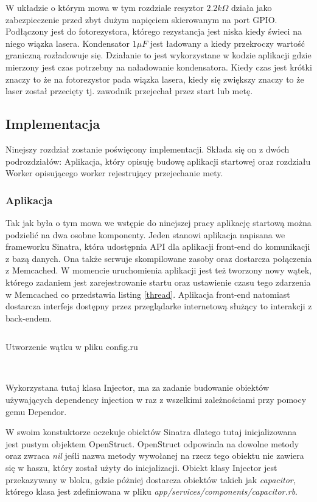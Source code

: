 \documentclass[11pt,a4paper, twoside]{article}
\begin{document}
\begin{minipage}{\textwidth}
\noindent
W układzie o którym mowa w tym rozdziale resyztor $2.2k \Omega$ działa jako zabezpieczenie przed zbyt dużym napięciem skierowanym na port GPIO. Podłączony jest do fotorezystora, którego rezystancja jest niska kiedy świeci na niego wiązka lasera. Kondensator $1\mu F$ jest ładowany a kiedy przekroczy wartość graniczną rozładowuje się. Działanie to jest wykorzystane w kodzie aplikacji gdzie mierzony jest czas potrzebny na naładowanie kondensatora. Kiedy czas jest krótki znaczy to że na fotorezystor pada wiązka lasera, kiedy się zwiększy znaczy to że laser został przecięty tj. zawodnik przejechał przez start lub metę.
\subsection{Implementacja}
Ninejszy rozdział zostanie poświęcony implementacji. Składa się on z dwóch podrozdziałów: Aplikacja, który opisuję budowę aplikacji startowej oraz rozdziału Worker opisującego worker rejestrujący przejechanie mety.
\subsubsection{Aplikacja}
Tak jak była o tym mowa we wstępie do ninejszej pracy aplikację startową można podzielić na dwa osobne komponenty. Jeden stanowi aplikacja napisana we frameworku Sinatra, która udostępnia API dla aplikacji front-end do komunikacji z bazą danych. Ona także serwuje skompilowane zasoby oraz dostarcza połączenia z Memcached. W momencie uruchomienia aplikacji jest też tworzony nowy wątek, którego zadaniem jest zarejestrowanie startu oraz ustawienie czasu tego zdarzenia w Memcached co przedstawia listing \ref{thread}.
	Aplikacja front-end natomiast dostarcza interfejs dostępny przez przeglądarke internetową służący to interakcji z back-endem.
\begin{listing}[H]
\inputminted[linenos=true]{ruby}{./src/thread.rb}
\caption{Utworzenie wątku w pliku config.ru}
$\label{thread}$
\end{listing}
\end{minipage}
\newpage
Wykorzystana tutaj klasa Injector, ma za zadanie budowanie obiektów używających dependency injection w raz z wszelkimi zależnościami przy pomocy gemu Dependor. 


W swoim konstuktorze oczekuje obiektów Sinatra dlatego tutaj inicjalizowana jest pustym objektem OpenStruct. OpenStruct odpowiada na dowolne metody oraz zwraca \emph{nil} jeśli nazwa metody wywołanej na rzecz tego obiektu nie zawiera się w haszu, który został użyty do inicjalizacji. 
\newline
\newline
\noindent
Obiekt klasy Injector jest przekazywany w bloku, gdzie póżniej dostarcza obiektów takich jak \emph{capacitor}, którego klasa jest zdefiniowana w pliku \newline \emph{app/services/components/capacitor.rb}. 
\end{document}
